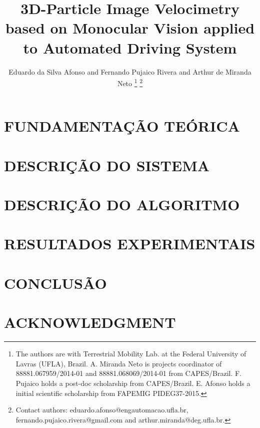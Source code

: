 \documentclass[letterpaper, 10 pt,conference]{ieeeconf}  %
\title{\LARGE \bf
3D-Particle Image Velocimetry based on Monocular Vision applied to Automated Driving System
}
\author{Eduardo da Silva Afonso and Fernando Pujaico Rivera and Arthur de Miranda Neto%
\thanks{The authors are with Terrestrial Mobility Lab. at the Federal University of Lavras (UFLA), Brazil. 
A. Miranda Neto is projects coordinator
of 88881.067959/2014-01 and 88881.068069/2014-01 from CAPES/Brazil. 
F. Pujaico holds a post-doc scholarship from CAPES/Brazil. 
E. Afonso holds a initial scientific scholarship from FAPEMIG PIDEG37-2015.}%
\thanks{Contact authors: eduardo.afonso@engautomacao.ufla.br, fernando.pujaico.rivera@gmail.com and
arthur.miranda@deg.ufla.br.}%
}
\begin{document}
\maketitle
\thispagestyle{empty}
\pagestyle{empty}

\begin{abstract}



\end{abstract}



\section{FUNDAMENTAÇÃO TEÓRICA}




\section{DESCRIÇÃO DO SISTEMA}


\section{DESCRIÇÃO DO ALGORITMO}
 





\section{RESULTADOS EXPERIMENTAIS}





\section{CONCLUSÃO}


\section*{ACKNOWLEDGMENT}



\end{document}
